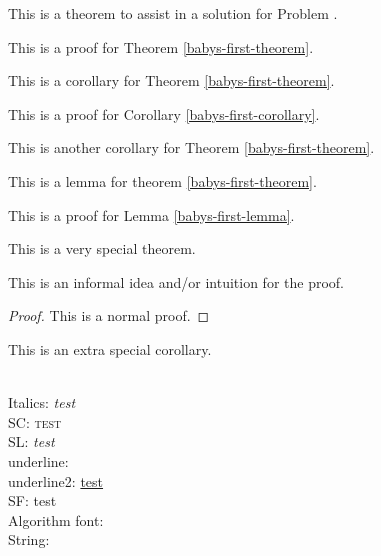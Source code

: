 \documentclass{article}
\begin{document}
\begin{solution}
    \begin{theorem}\label{babys-first-theorem}
        This is a theorem to assist in a solution for Problem \theproblem.
    \end{theorem}
    \begin{theoremproof}
        This is a proof for Theorem \ref{babys-first-theorem}.
    \end{theoremproof}
    \begin{corollary} \label{babys-first-corollary}
        This is a corollary for Theorem \ref{babys-first-theorem}.
    \end{corollary}
    \begin{corollaryproof}
        This is a proof for Corollary \ref{babys-first-corollary}.
    \end{corollaryproof}
    \begin{corollary} 
        This is another corollary for Theorem \ref{babys-first-theorem}.
    \end{corollary}
    \begin{lemma} \label{babys-first-lemma}
        This is a lemma for theorem \ref{babys-first-theorem}.
    \end{lemma}
    \begin{lemmaproof}
        This is a proof for Lemma \ref{babys-first-lemma}.
    \end{lemmaproof}
    
    \begin{theorem}
        This is a very special theorem.
    \end{theorem}
    \begin{proofsketch}
        This is an informal idea and/or intuition for the proof.
    \end{proofsketch}
    \begin{proof}
        This is a normal proof.
    \end{proof}
    \begin{corollary}
        This is an extra special corollary.
    \end{corollary}
    
    \\
    Italics: \textit{test}\\
    SC: \textsc{test}\\
    SL: \textsl{test}\\
    underline: \\
    underline2: \underline{test}\\
    SF: \textsf{test}\\
    Algorithm font: \\
    String: \\
    
\end{solution}
\end{document}
